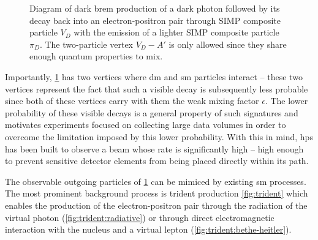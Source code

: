 \begin{figure}
	\centering
	\caption{
		Diagram of dark brem production of a dark photon followed by its decay back into an electron-positron pair
		through SIMP composite particle $V_D$ with the emission of a lighter SIMP composite particle $\pi_D$.
		The two-particle vertex $V_D-A'$ is only allowed since they share enough quantum properties to mix.
	}
	\label{fig:dark-brem-simp-decay}
\end{figure}

Importantly, \cref{fig:dark-brem-simp-decay} has two vertices where \ac{dm} and \ac{sm} particles
interact -- these two vertices represent the fact that such a visible decay is subsequently less
probable since both of these vertices carry with them the weak mixing factor $\epsilon$.
The lower probability of these visible decays is a general property of such signatures and motivates
experiments focused on collecting large data volumes in order to overcome the limitation imposed
by this lower probability.
With this in mind, \ac{hps} has been built to observe a beam whose rate is significantly high --
high enough to prevent sensitive detector elements from being placed directly within its path.

The observable outgoing particles of \cref{fig:dark-brem-simp-decay} can be mimiced by existing \ac{sm}
processes.
The most prominent background process is trident production \cref{fig:trident} which enables
the production of the electron-positron pair through the radiation of the virtual photon (\cref{fig:trident:radiative})
or through direct electromagnetic interaction with the nucleus and a virtual lepton (\cref{fig:trident:bethe-heitler}).

